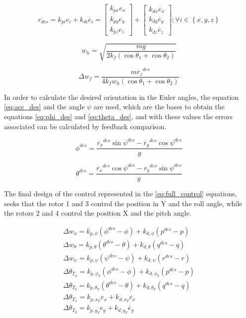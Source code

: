 \documentclass[a4paper, 12pt, oneside]{book}
\begin{document}
\begin{equation}
\ddot{r_{des}}=k_{pi}e_i+k_{di}\dot{e_i}=
\begin{bmatrix}
k_{px}e_x\\ 
k_{py}e_y\\ 
k_{pz}e_z
\end{bmatrix}
+
\begin{bmatrix}
k_{dx}\dot{e_x}\\ 
k_{dy}\dot{e_y}\\ 
k_{dz}\dot{e_z}
\end{bmatrix}
;
\forall i \in \left \{ x, y, z \right \}
\label{eq:acc_des}
\end{equation}

\begin{equation}
w_h=\sqrt{\frac{mg}{2k_f(\cos\theta_1+\cos\theta_2)}}
\label{eq:w}
\end{equation}

\begin{equation}
\Delta w_f=\frac{m\ddot{r_z}^{des}}{4k_fw_h(\cos\theta_1+\cos\theta_2)}
\label{eq:dw}
\end{equation}

In order to calculate the desired orientation in the Euler angles, the equation \ref{eq:acc_des} and the angle $\psi$ are used, which are the bases to obtain the equations \ref{eq:phi_des} and \ref{eq:theta_des}, and with these values the errors associated can be calculated by feedback comparison.

\begin{equation}
\phi^{des}=\frac{\ddot{r_x}^{des}\sin\psi^{des}-\ddot{r_y}^{des}\cos\psi^{des}}{g}
\label{eq:phi_des}
\end{equation}

\begin{equation}
\theta^{des}=\frac{\ddot{r_x}^{des}\cos\psi^{des}-\ddot{r_y}^{des}\sin\psi^{des}}{g}
\label{eq:theta_des}
\end{equation}

The final design of the control represented in the \ref{eq:full_control} equations, seeks that the rotor 1 and 3 control the position in Y and the roll angle, while the rotors 2 and 4 control the position X and the pitch angle.

\begin{equation}
\begin{split}
\Delta w_\phi=k_{p,\phi}(\phi^{des}-\phi)+k_{d,\phi}(p^{des}-p)\\
\Delta w_\theta=k_{p,\theta}(\theta^{des}-\theta)+k_{d,\theta}(q^{des}-q)\\
\Delta w_\psi=k_{p,\psi}(\psi^{des}-\psi)+k_{d,\psi}(r^{des}-r)\\
\Delta \theta_{T_\phi}=k_{p,\phi_T}(\phi^{des}-\phi)+k_{d,\phi_T}(p^{des}-p)\\
\Delta \theta_{T_\theta}=k_{p,\theta_T}(\theta^{des}-\theta)+k_{d,\theta_T}(q^{des}-q)\\
\Delta \theta_{T_x}=k_{p,x_T}e_x+k_{d,x_T}\dot{e_x}\\
\Delta \theta_{T_y}=k_{p,y_T}e_y+k_{d,y_T}\dot{e_y}
\end{split}
\label{eq:full_control}
\end{equation}
\end{document}
